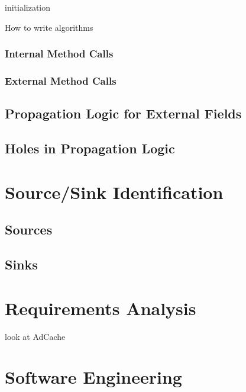 \documentclass[12pt,twoside,notitlepage]{report}
\begin{document}
\begin{algorithm}[H]
 initialization\;
 \caption{How to write algorithms}
\end{algorithm}

\subsubsection{Internal Method Calls}

\subsubsection{External Method Calls}

\subsection{Propagation Logic for External Fields}

\subsection{Holes in Propagation Logic}

\section{Source/Sink Identification}

\subsection{Sources}

\subsection{Sinks}

\section{Requirements Analysis}
look at AdCache

\section{Software Engineering}
\end{document}
